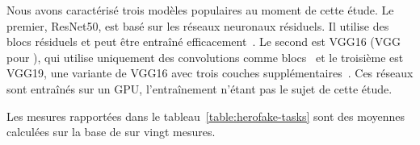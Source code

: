 \begin{table}[!ht]
    \caption{Caractérisation des charges de travail.}
    \centering
    \label{table:herofake-tasks}
\end{table}

Nous avons caractérisé trois modèles populaires au moment de cette étude. Le premier, ResNet50, est basé sur les réseaux neuronaux résiduels. Il utilise des blocs résiduels et peut être entraîné efficacement~\cite{NEURIPS2019_7716d0fc}. Le second est VGG16 (VGG pour ), qui utilise uniquement des convolutions comme blocs~\cite{DBLP:journals/corr/SimonyanZ14a} et le troisième est VGG19, une variante de VGG16 avec trois couches supplémentaires~\cite{biom10070984}. Ces réseaux sont entraînés sur un GPU, l'entraînement n'étant pas le sujet de cette étude.

Les mesures rapportées dans le tableau~\ref{table:herofake-tasks} sont des moyennes calculées sur la base de sur vingt mesures.

